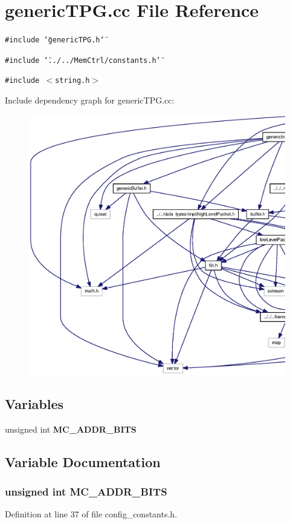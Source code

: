 \section{genericTPG.cc File Reference}
\label{genericTPG_8cc}
{\tt \#include \char`\"{}genericTPG.h\char`\"{}}\par
{\tt \#include \char`\"{}../../MemCtrl/constants.h\char`\"{}}\par
{\tt \#include $<$string.h$>$}\par


Include dependency graph for genericTPG.cc:\nopagebreak
\begin{figure}[H]
\begin{center}
\leavevmode
\includegraphics[width=420pt]{genericTPG_8cc__incl}
\end{center}
\end{figure}
\subsection*{Variables}
\begin{CompactItemize}
\item 
unsigned int {\bf MC\_\-ADDR\_\-BITS}
\end{CompactItemize}


\subsection{Variable Documentation}
\subsubsection[{MC\_\-ADDR\_\-BITS}]{\setlength{\rightskip}{0pt plus 5cm}unsigned int {\bf MC\_\-ADDR\_\-BITS}}\label{genericTPG_8cc_5797f7fc969d8a7c02df4ba708ed734f}




Definition at line 37 of file config\_\-constants.h.